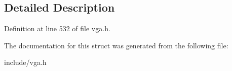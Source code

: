 \subsection{Detailed Description}


Definition at line 532 of file vga.\-h.



The documentation for this struct was generated from the following file\-:\begin{DoxyCompactItemize}
\item 
include/vga.\-h\end{DoxyCompactItemize}
